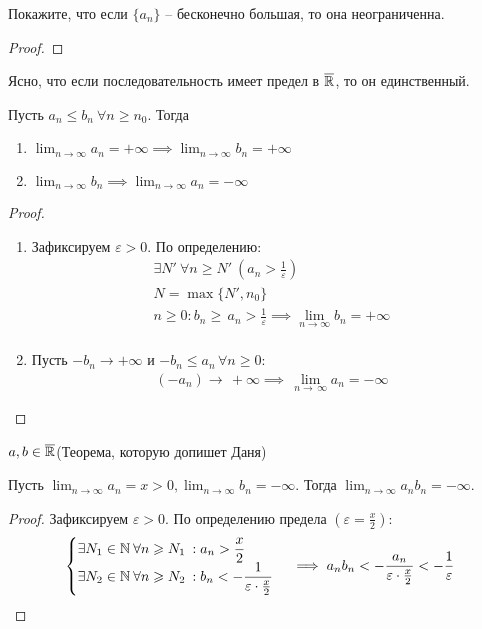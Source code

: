 \begin{exercise}
    Покажите, что если $ \{a_n\} $ -- бесконечно большая, то она неограниченна. 
\end{exercise}
\begin{proof}
    
\end{proof}
\begin{note}
    Ясно, что если последовательность имеет предел в $\overline{\mathbb{R}} $, то он единственный.
\end{note}
\begin{theorem}
    Пусть $ a_n \leq  b_n \ \forall n \geq n_0$. Тогда \begin{enumerate}
        \item $ \lim_{n \to  \infty} a_n  = + \infty \implies \lim_{n \to \infty} b_n = + \infty $
        \item $ \lim_{n \to  \infty} b_n \implies  \lim_{n \to \infty}a_n = - \infty$
    \end{enumerate}
\end{theorem} \begin{proof} \phantom \newline \begin{enumerate}
    \item Зафиксируем $ \varepsilon > 0 $. По определению: \begin{gather}
        \exists N'\: \forall n \geq N' \: \left(a_n > \frac{1}{\varepsilon}\right)\\
        N = \max\{N', n_0\} \\
        n \geq 0: b_n \geq\, a_n > \frac{1}{\varepsilon} \implies \lim_{n \to \infty} b_n = + \infty \\
    \end{gather}
    \item  Пусть $ - b_n \to  + \infty $ и $ - b_n \leq  a_n  \, \forall n \geq  0 $:
    \begin{gather}
        ( - a_n) \to\, + \infty \implies\, \lim_{n \to\, \infty} a_n = - \infty
    \end{gather}
\end{enumerate}
\end{proof}
\begin{exercise}
    $ a, b \in  \overline{\mathbb{R}} $(Теорема, которую допишет Даня)
\end{exercise}
\begin{example}
    Пусть $ \lim_{n \to \infty} a_n = x > 0, \lim_{n \to  \infty}b_n = - \infty $. Тогда $ \lim_{n \to \infty}a_n b_n = - \infty $.
\end{example} \begin{proof}
    Зафиксируем $ \varepsilon > 0 $. По определению предела $ (\varepsilon = \frac{x}{2}) $: 
    \begin{gather} \begin{cases} 
        \exists N_1 \in \mathbb{N}\:  \forall n \geqslant N_1\:: a_n > \dfrac{x}{2} \\
        \exists N_2 \in \mathbb{N}\:  \forall n \geqslant N_2\:: b_n < - \dfrac{1}{\varepsilon \cdot \frac{x}{2}} \end{cases} \implies a_n b_n < -\dfrac{a_n}{\varepsilon \cdot \frac{x}{2}} < - \frac{1}{\varepsilon}
    \end{gather}
\end{proof}
